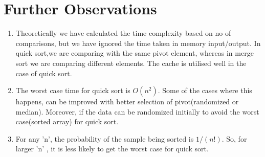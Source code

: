 \documentclass{article}
\begin{document}
\section{Further Observations}
\begin{enumerate}
\item Theoretically we have calculated the time complexity based on no of comparisons, but we have ignored the time taken in memory input/output.
In quick sort,we are comparing with the same pivot element, whereas in merge sort we are comparing different elements.
The cache is utilised well in the case of quick sort.
\item The worst case time for quick sort is $O(n^2)$. Some of the cases where this happens, can be improved with better selection of pivot(randomized or median).
Moreover, if the data can be randomized initially to avoid the worst case(sorted array) for quick sort.
\item For any 'n', the probability of the sample being sorted is $1/(n!)$. So, for larger 'n' , it is less likely to get the worst case for quick sort.
\end{enumerate}
\end{document}
